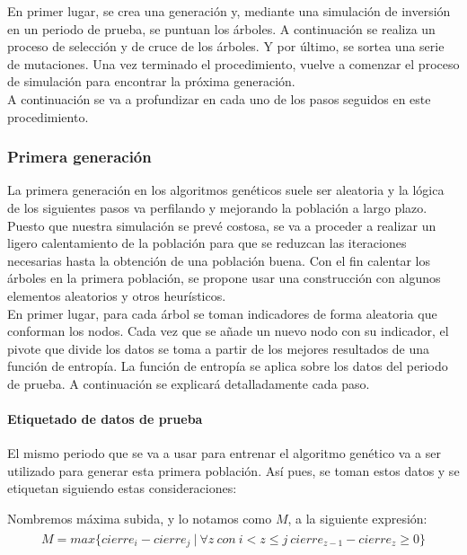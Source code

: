 En primer lugar, se crea una generaci\'on y, mediante una simulaci\'on de inversi\'on en un periodo de prueba, se puntuan los \'arboles. A continuaci\'on se realiza un proceso de selecci\'on y de cruce de los \'arboles. Y por \'ultimo, se sortea una serie de mutaciones. Una vez terminado el procedimiento, vuelve a comenzar el proceso de simulaci\'on para encontrar la pr\'oxima generaci\'on.\\

A continuaci\'on se va a profundizar en cada uno de los pasos seguidos en este procedimiento.\\

\subsubsection{Primera generaci\'on}
La primera generaci\'on en los algoritmos gen\'eticos suele ser aleatoria y la l\'ogica de los siguientes pasos va perfilando y mejorando la poblaci\'on a largo plazo.\\

Puesto que nuestra simulaci\'on se prev\'e costosa, se va a proceder a realizar un ligero calentamiento de la poblaci\'on para que se reduzcan las iteraciones necesarias hasta la obtenci\'on de una poblaci\'on buena. Con el fin calentar los \'arboles en la primera poblaci\'on, se propone usar una construcci\'on con algunos elementos aleatorios y otros heur\'isticos.\\

En primer lugar, para cada \'arbol se toman indicadores de forma aleatoria que conforman los nodos. Cada vez que se a\~nade un nuevo nodo con su indicador, el pivote que divide los datos se toma a partir de los mejores resultados de una funci\'on de entrop\'ia. La funci\'on de entrop\'ia se aplica sobre los datos del periodo de prueba. A continuaci\'on se explicar\'a detalladamente cada paso. \\

\paragraph{Etiquetado de datos de prueba}
El mismo periodo que se va a usar para entrenar el algoritmo gen\'etico va a ser utilizado para generar esta primera poblaci\'on. As\'i pues, se toman estos datos y se etiquetan siguiendo estas consideraciones:

    Nombremos m\'axima subida, y lo notamos como $M$, a la siguiente expresi\'on:\\
    \begin{align*}
    \begin{split}
        M = max\{cierre_{i} - cierre_{j} \:|\: \forall z\: con \:i < z\leq j\: cierre_{z-1} - cierre_{z} \geq 0 \}
    \end{split}
    \end{align*}
    
